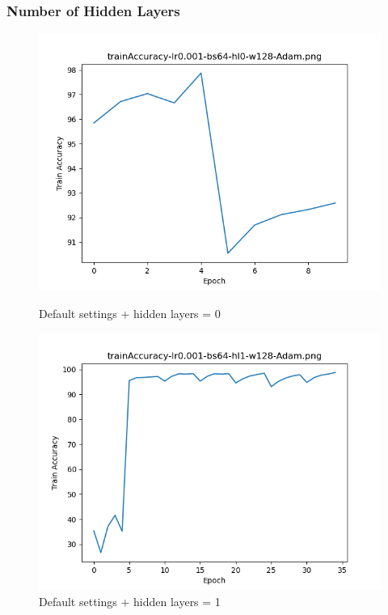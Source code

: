 \documentclass{article}[12pt]
\begin{document}
\subsubsection{Number of Hidden Layers}

    \begin{figure}[H]
        \includegraphics[width=\linewidth]{testsResults/trainAccuracy/trainAccuracy-lr0.001-bs64-hl0-w128-Adam.png}
        \caption{Default settings + hidden layers = 0}
        \endminipage\hfill
        \includegraphics[width=\linewidth]{testsResults/trainAccuracy/trainAccuracy-lr0.001-bs64-hl1-w128-Adam.png}
        \caption{Default settings + hidden layers = 1}
        \endminipage
    \end{figure}
\end{document}
